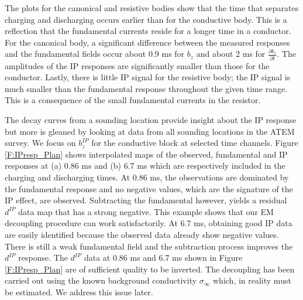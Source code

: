 \documentclass[extra,mreferee]{gji}
\newcommand{\siginf}{\sigma_\infty}
\newcommand{\dip}{d^{IP}}
\begin{document}
The plots for the canonical and resistive bodies show that the time that separates charging and discharging occurs earlier than for the conductive body. This is a reflection that the fundamental currents reside for a longer time in a conductor. For the canonical body, a significant difference between the measured responses and the fundamental fields occur about 0.9 ms for $b_z$ and about 2 ms for $\frac{\partial b_z}{\partial t}$. The amplitudes of the IP responses are significantly smaller than those for the conductor.  Lastly, there is little IP signal for the resistive body; the IP signal is much smaller than the fundamental response throughout the given time range. This is a consequence of the small fundamental currents in the resistor. 

The decay curves from a sounding location  provide insight about the IP response but more is gleaned by looking at data from all  sounding locations in the ATEM survey. We focus on $b_z^{IP}$ for the conductive block at selected time channels. Figure \ref{F:IPresp_Plan} shows interpolated maps of the observed, fundamental and IP responses at (a) 0.86 ms and (b) 6.7 ms which are respectively included in the charging and discharging times. 
At 0.86 ms, the observations are dominated by the fundamental response and no negative values,  which are the signature of the IP effect, are observed. Subtracting the fundamental however, yields a residual $\dip$ data map that has a strong negative. This  example  shows that our EM decoupling procedure can  work satisfactorily.  At 6.7 ms, obtaining good IP data are easily identified because the observed data already show negative values. There is still a weak fundamental field and the subtraction process improves the $\dip$ response. The $\dip$ data at  0.86 ms and 6.7 ms shown in Figure \ref{F:IPresp_Plan} are of sufficient quality to be inverted. The decoupling has been carried out using the known background conductivity $\siginf$ which, in reality must be estimated. We address this issue later. 
\end{document}
